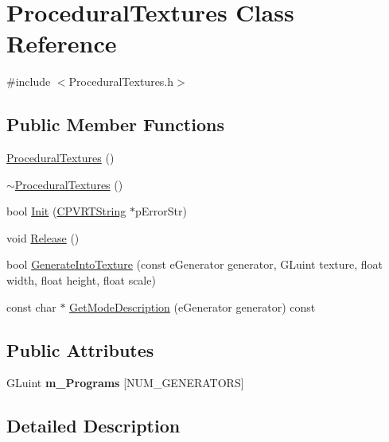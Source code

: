 \hypertarget{class_procedural_textures}{\section{Procedural\+Textures Class Reference}
\label{class_procedural_textures}
}


{\ttfamily \#include $<$Procedural\+Textures.\+h$>$}

\subsection*{Public Member Functions}
\begin{DoxyCompactItemize}
\item 
\hyperlink{class_procedural_textures_a653224e00f5ec2345b3ff87c435fade4}{Procedural\+Textures} ()
\item 
\hyperlink{class_procedural_textures_afcdd7a422523d813cc06bb448ed3691e}{$\sim$\+Procedural\+Textures} ()
\item 
bool \hyperlink{class_procedural_textures_a354741cb335a1e067094479665c09422}{Init} (\hyperlink{class_c_p_v_r_t_string}{C\+P\+V\+R\+T\+String} $\ast$p\+Error\+Str)
\item 
void \hyperlink{class_procedural_textures_ada307c81d3e6f69625705538aa0a16dd}{Release} ()
\item 
bool \hyperlink{class_procedural_textures_ad493d760926439064bb3390372265d21}{Generate\+Into\+Texture} (const e\+Generator generator, G\+Luint texture, float width, float height, float scale)
\item 
const char $\ast$ \hyperlink{class_procedural_textures_a08962f2fb7c16751f95b9b1f70899d11}{Get\+Mode\+Description} (e\+Generator generator) const 
\end{DoxyCompactItemize}
\subsection*{Public Attributes}
\begin{DoxyCompactItemize}
\item 
\hypertarget{class_procedural_textures_ae90392d6b65e44aabaccbc091cd81f8e}{G\+Luint {\bfseries m\+\_\+\+Programs} \mbox{[}N\+U\+M\+\_\+\+G\+E\+N\+E\+R\+A\+T\+O\+R\+S\mbox{]}}\label{class_procedural_textures_ae90392d6b65e44aabaccbc091cd81f8e}

\end{DoxyCompactItemize}


\subsection{Detailed Description}


